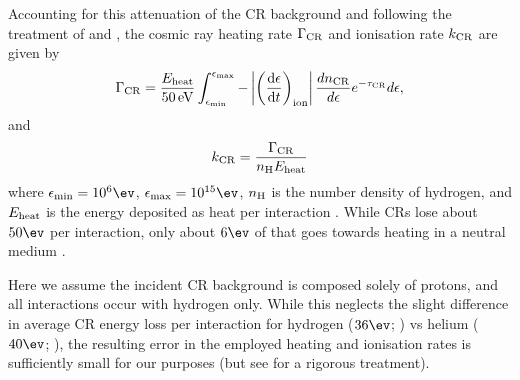 Accounting for this attenuation of the CR background and following the treatment of \citet{StacyBromm2007} and \citet{InayoshiOmukai2011}, the cosmic ray heating rate $\Gamma_{\rm \small CR}$ and ionisation rate $k_{\rm \small CR}$ are given by
\begin{equation}
\Gamma_{\rm \small CR} = 
    \frac{ E_{\rm \small heat}}{50\,{\rm \small eV}} 
    \int_{\epsilon_{\rm min}}^{\epsilon_{\rm max}} 
    - \left| \left( \frac{{\rm d}\epsilon} {{\rm d}t} \right)_{\rm ion} \right|
    \frac{dn_{\rm \tiny CR}}{d\epsilon} e^{-\tau_{\rm \small CR}} d\epsilon,
\end{equation}
and 
\begin{equation}
k_{\rm \small CR} = \frac{\Gamma_{\rm \small CR}}{ n_{\rm \small H} E_{\rm \small heat}}
\end{equation}
where $\epsilon_{\rm min} = 10^6\ev$, $\epsilon_{\rm max}= 10^{15}\ev$, $n_{\rm \small H}$ is the number density of hydrogen, and $E_{\rm \small heat}$ is the energy deposited as heat per interaction \citep{Schlickeiser2002}.
While CRs lose about $50\ev$ per interaction, only about $6\ev$ of that goes towards heating in a neutral medium \citep{SpitzerScott1969,ShullvanSteenberg1985}.

Here we assume the incident CR background is composed solely of protons, and all interactions occur with hydrogen only.  While this neglects the slight difference in average CR energy loss per interaction for hydrogen ($36\ev$; \citet{BakkerSegre1951}) vs helium ($40\ev$; \citet{WeissBernstein1956}), the resulting error in the employed heating and ionisation rates is sufficiently small for our purposes (but see \citet{JascheCiardiEnsslin2007} for a rigorous treatment).